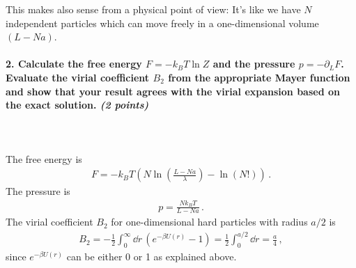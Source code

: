 This makes also sense from a physical point of view: It's like we have $N$ independent particles which can move freely in a one-dimensional volume 
$(L-Na)$.


\newpage

\paragraph{2. Calculate the free energy $F=-k_BT\ln Z$ and the pressure $p=-\partial_L F$. Evaluate the virial
coefficient $B_2$ from the appropriate Mayer function and show that your result agrees with the
virial expansion based on the exact solution. \textit{(2 points)}
} \ \\
\\
The free energy is
\begin{align}
	F = - k_B T \left( N \ln\left( \frac{L-Na}{\lambda} \right) - \ln\left(N!\right) \right) \,.
\end{align}
The pressure is
\begin{align}
	p = \frac{N k_B T}{L-Na} \,.
\end{align}
The virial coefficient $B_2$ for one-dimensional hard particles with radius $a/2$ is
\begin{align}
	B_2 = -\frac{1}{2} \int_0^{\infty} \dd r \, \left( e^{-\beta U(r)} - 1 \right) = \frac{1}{2} \int_0^{a/2} \dd r = \frac{a}{4} \,,
\end{align}
since $e^{-\beta U(r)}$ can be either 0 or 1 as explained above.